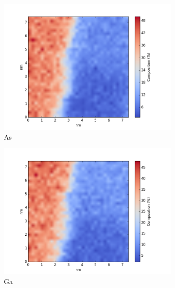 \begin{figure}
	\centering
	\begin{subfigure}{0.5\textwidth}
		\includegraphics[width=\textwidth]{fig/q/E_heated/_binned_As_zetaAbs}
		\caption{As}
		\label{fig:Eas}
	\end{subfigure}%
	\hfill
	\begin{subfigure}{0.5\textwidth}
		\includegraphics[width=\textwidth]{fig/q/E_heated/_binned_Ga_zetaAbs}
		\caption{Ga}
		\label{fig:Ega}
	\end{subfigure}
	\centering
	\begin{subfigure}{0.5\textwidth}

\end{subfigure}
\end{figure}
